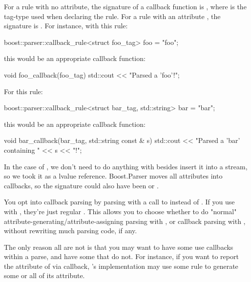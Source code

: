 \documentclass{MyBook}
\begin{document}
For a rule with no attribute, the signature of a callback function is , where  is the tag-type used when declaring the rule. For a rule with an attribute , the signature is . For instance, with this rule:

\begin{code}
boost::parser::callback_rule<struct foo_tag> foo = "foo";
\end{code}

this would be an appropriate callback function:

\begin{code}
void foo_callback(foo_tag)
{
    std::cout << "Parsed a 'foo'!\n";
}
\end{code}

For this rule:

\begin{code}
boost::parser::callback_rule<struct bar_tag, std::string> bar = "bar";
\end{code}

this would be an appropriate callback function:

\begin{code}
void bar_callback(bar_tag, std::string const & s)
{
    std::cout << "Parsed a 'bar' containing " << s << "!\n";
}
\end{code}

\begin{marker}[title=Important ]
In the case of , we don't need to do anything with  besides insert it into a stream, so we took it as a  lvalue reference. Boost.Parser moves all attributes into callbacks, so the signature could also have been  or . 
\end{marker}

You opt into callback parsing by parsing with a call to  instead of . If you use  with , they're just regular . This allows you to choose whether to do "normal" attribute-generating/attribute-assigning parsing with , or callback parsing with , without rewriting much parsing code, if any.

The only reason all  are not  is that you may want to have some  use callbacks within a parse, and have some that do not. For instance, if you want to report the attribute of   via callback, 's implementation may use some rule  to generate some or all of its attribute.
\end{document}
